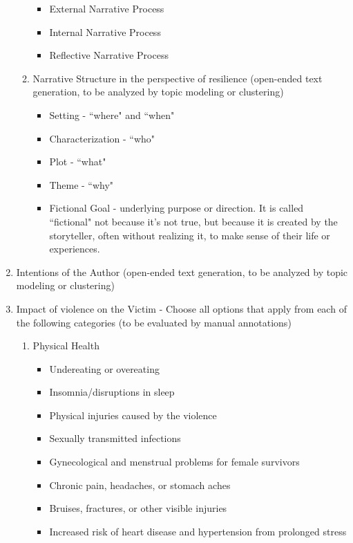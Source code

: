\documentclass[letterpaper, 10pt]{article}
\begin{document}
\begin{enumerate}
\begin{enumerate}
\begin{itemize}
            \item External Narrative Process
            \item Internal Narrative Process
            \item Reflective Narrative Process
        \end{itemize}
        \item Narrative Structure in the perspective of resilience (open-ended text generation, to be analyzed by topic modeling or clustering)
        \begin{itemize}
            \item Setting - ``where" and ``when"
            \item Characterization - ``who"
            \item Plot - ``what"
            \item Theme - ``why"
            \item Fictional Goal - underlying purpose or direction. It is called ``fictional" not because it's not true, but because it is created by the storyteller, often without realizing it, to make sense of their life or experiences.
        \end{itemize}
    \end{enumerate}
    \item Intentions of the Author (open-ended text generation, to be analyzed by topic modeling or clustering)
    \item Impact of violence on the Victim - Choose all options that apply from each of the following categories (to be evaluated by manual annotations)
    \begin{enumerate}
        \item Physical Health
        \begin{itemize}
            \item Undereating or overeating
            \item Insomnia/disruptions in sleep
            \item Physical injuries caused by the violence
            \item Sexually transmitted infections
            \item Gynecological and menstrual problems for female survivors
            \item Chronic pain, headaches, or stomach aches
            \item Bruises, fractures, or other visible injuries
            \item Increased risk of heart disease and hypertension from prolonged stress

\end{itemize}
\end{enumerate}
\end{enumerate}
\end{document}
